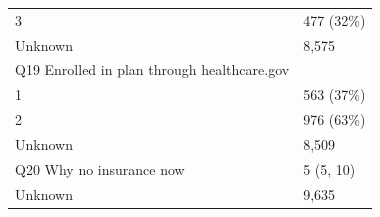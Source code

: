 \documentclass[]{article}
\begin{document}
\begin{longtable}[]{@{}ll@{}}
\begin{minipage}[t]{0.71\columnwidth}
3\strut
\end{minipage} & \begin{minipage}[t]{0.23\columnwidth}\raggedright
477 (32\%)\strut
\end{minipage}\tabularnewline
\begin{minipage}[t]{0.71\columnwidth}\raggedright
Unknown\strut
\end{minipage} & \begin{minipage}[t]{0.23\columnwidth}\raggedright
8,575\strut
\end{minipage}\tabularnewline
\begin{minipage}[t]{0.71\columnwidth}\raggedright
Q19 Enrolled in plan through healthcare.gov\strut
\end{minipage} & \begin{minipage}[t]{0.23\columnwidth}\raggedright
\strut
\end{minipage}\tabularnewline
\begin{minipage}[t]{0.71\columnwidth}\raggedright
1\strut
\end{minipage} & \begin{minipage}[t]{0.23\columnwidth}\raggedright
563 (37\%)\strut
\end{minipage}\tabularnewline
\begin{minipage}[t]{0.71\columnwidth}\raggedright
2\strut
\end{minipage} & \begin{minipage}[t]{0.23\columnwidth}\raggedright
976 (63\%)\strut
\end{minipage}\tabularnewline
\begin{minipage}[t]{0.71\columnwidth}\raggedright
Unknown\strut
\end{minipage} & \begin{minipage}[t]{0.23\columnwidth}\raggedright
8,509\strut
\end{minipage}\tabularnewline
\begin{minipage}[t]{0.71\columnwidth}\raggedright
Q20 Why no insurance now\strut
\end{minipage} & \begin{minipage}[t]{0.23\columnwidth}\raggedright
5 (5, 10)\strut
\end{minipage}\tabularnewline
\begin{minipage}[t]{0.71\columnwidth}\raggedright
Unknown\strut
\end{minipage} & \begin{minipage}[t]{0.23\columnwidth}\raggedright
9,635\strut
\end{minipage}\tabularnewline

\end{longtable}
\end{document}
